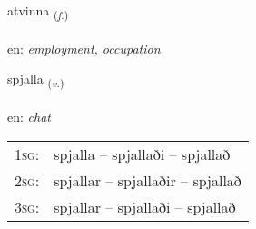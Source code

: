 \documentclass[frontgrid, backgrid]{flacards}\usepackage[]{graphicx}\usepackage[]{xcolor}
\begin{document}
{atvinna \small{\textsubscript{(\textit{f.})}} \\[1ex] %
\textphonetic{[aːtvɪna]} \\
en: \emph{employment, occupation} \\  [2ex]
\renewcommand*{\arraystretch}{0.8}
}

\renewcommand{\flhead}{\vskip5pt \fboxsep=0pt {\small\bfseries\footnotesize Sagnorð | Verb}}
\renewcommand{\fcfoot}{\vskip5pt \fboxsep=0pt \hspace{2pt}{\small\bfseries\footnotesize 3K}}

\renewcommand{\blhead}{\vskip5pt {\small\bfseries\footnotesize Sagnorð | Verb }}
\renewcommand{\bcfoot}{\vskip5pt \hspace{2pt}{\small\bfseries\footnotesize 3K}}


{spjalla \small{\textsubscript{(\textit{v.})}} \\[1ex] %
\textphonetic{[spjatla]} \\
en: \emph{chat} \\  [2ex]
\renewcommand*{\arraystretch}{0.8}
\begin{tabular}{p{1cm}l}
\textsc{1sg}: & spjalla -- spjallaði -- spjallað \\ 
\textsc{2sg}: & spjallar -- spjallaðir -- spjallað \\ 
\textsc{3sg}: & spjallar -- spjallaði -- spjallað \\ 
\end{tabular}
}

\renewcommand{\flhead}{\vskip5pt \fboxsep=0pt {\small\bfseries\footnotesize Nafnorð | Noun}}
\renewcommand{\fcfoot}{\vskip5pt \fboxsep=0pt \hspace{2pt}{\small\bfseries\footnotesize 3K}}
\end{document}
